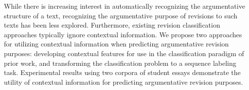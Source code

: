 While there is increasing interest in automatically recognizing the argumentative structure of a text, recognizing the argumentative purpose of revisions to such texts has been less explored. Furthermore, existing revision classification approaches typically ignore  contextual information. We propose two approaches for utilizing contextual information when predicting argumentative revision purposes: developing contextual features for use in the classification paradigm of prior work, and transforming the classification problem to a sequence labeling task. Experimental results using two corpora of  student essays demonstrate the utility of contextual information for predicting argumentative revision purposes.
